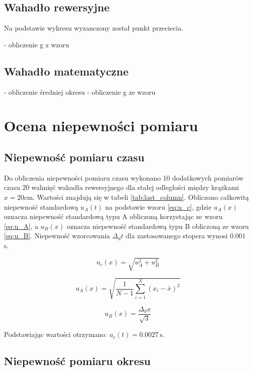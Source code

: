\documentclass[a4paper,12pt]{article}
\begin{document}
\subsection{Wahadło rewersyjne}

Na podstawie wykresu wyzanczony został punkt przeciecia.

- obliczenie g z wzoru

\subsection{Wahadło matematyczne}

- obliczenie średniej okresu
- obliczenie g ze wzoru


\section{Ocena niepewności pomiaru}


\subsection{Niepewność pomiaru czasu}

Do obliczenia niepewności pomiaru czasu wykonano 10 dodatkowych pomiarów czasu 20 wahnięć wahadła rewersyjnego dla stałej odległości między krążkami $x=20 \text{cm}$. Wartości znajdują się w tabeli \ref{tab:last_column}. Obliczono całkowitą niepewność standardową $u_A(t)$ na podstawie wzoru \ref{eq:u_c}, gdzie $u_A(x)$ oznacza niepewność standardową typu A obliczoną korzystając ze wzoru \ref{eq:u_A}, a $u_B(x)$ oznacza niepewność standardową typu B obliczoną ze wzoru \ref{eq:u_B}. Niepewność wzorcowania $\Delta_d t$ dla zastosowanego stopera wynosi $0.001$ s.
 
\begin{equation}
\label{eq:u_c}
u_c(x) = \sqrt{u_A^2 + u_B^2}
\end{equation}

\begin{equation}
\label{eq:u_A}
u_A(x) = \sqrt{\frac{1}{N-1} \sum_{i=1}^{N} (x_i - \bar{x})^2}
\end{equation}

\begin{equation}
\label{eq:u_B}
u_B(x) = \frac{\Delta_d x}{\sqrt{3}}
\end{equation}



Podstawiając wartości otrzymano: $u_c(t) = 0.0027\,\text{s}$.

\subsection{Niepewność pomiaru okresu}
\end{document}
